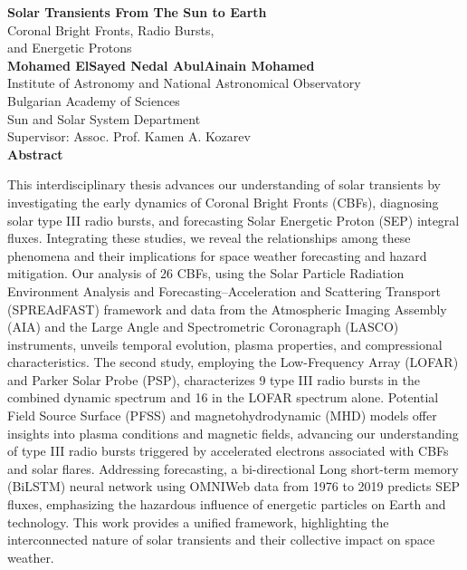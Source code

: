 \begin{center}
	\vspace*{0.25cm}
	\huge
	\textbf{Solar Transients From The Sun to Earth\\}
	\huge
	Coronal Bright Fronts, Radio Bursts,\\and Energetic Protons\\
	\vspace{0.5cm}
	\large
	\textbf{Mohamed ElSayed Nedal AbulAinain Mohamed\\}
	\vspace{0.5cm}
	\normalfont
	Institute of Astronomy and National Astronomical Observatory\\
	Bulgarian Academy of Sciences\\
	Sun and Solar System Department\\
	\vspace{0.5cm}
	\normalfont
	Supervisor: Assoc. Prof. Kamen A. Kozarev\\
	\vspace{1.5cm}
	\huge
	\textbf{Abstract}
	\vspace{0.7cm}
\end{center}


This interdisciplinary thesis advances our understanding of solar transients by investigating the early dynamics of Coronal Bright Fronts (CBFs), diagnosing solar type III radio bursts, and forecasting Solar Energetic Proton (SEP) integral fluxes. Integrating these studies, we reveal the relationships among these phenomena and their implications for space weather forecasting and hazard mitigation. Our analysis of 26 CBFs, using the Solar Particle Radiation Environment Analysis and Forecasting–Acceleration and Scattering Transport (SPREAdFAST) framework and data from the Atmospheric Imaging Assembly (AIA) and the Large Angle and Spectrometric Coronagraph (LASCO) instruments, unveils temporal evolution, plasma properties, and compressional characteristics. The second study, employing the Low-Frequency Array (LOFAR) and Parker Solar Probe (PSP), characterizes 9 type III radio bursts in the combined dynamic spectrum and 16 in the LOFAR spectrum alone. Potential Field Source Surface (PFSS) and magnetohydrodynamic (MHD) models offer insights into plasma conditions and magnetic fields, advancing our understanding of type III radio bursts triggered by accelerated electrons associated with CBFs and solar flares. Addressing forecasting, a bi-directional Long short-term memory (BiLSTM) neural network using OMNIWeb data from 1976 to 2019 predicts SEP fluxes, emphasizing the hazardous influence of energetic particles on Earth and technology. This work provides a unified framework, highlighting the interconnected nature of solar transients and their collective impact on space weather.
